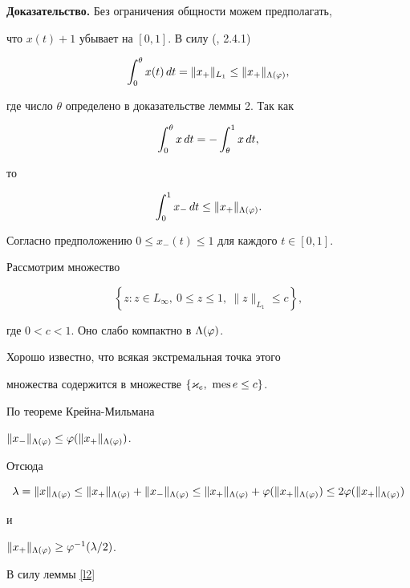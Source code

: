 {\bf Доказательство.} Без ограничения общности можем предполагать, 


что $x(t) +1$ убывает на $[0,1]$. В силу (\cite{KPS}, 2.4.1)


$$


\intl{0}{\theta} x(t)\, dt = \|x_+\|_{L_1} \le \|x_+ \|_{\Lambda(\ph)}, 


$$


где число $\theta$ определено в доказательстве леммы 2. Так как 


$$


\intl{0}{\theta} x\, dt = -\intl{\theta}{1} x\, dt, 


$$


то 


$$


\intl{0}{1} x_- \, dt\le \|x_+ \|_{\Lambda (\ph)}. 


$$





Согласно предположению $0 \le x_- (t) \le 1$ для каждого $t\in [0,1]$.


Рассмотрим множество


$$


\left\{ z: z\in L_\infty, \ 0 \le z \le 1, \ \|z\|_{L_1} \le c\right\}, 


$$


где $0 < c < 1$. Оно слабо компактно в $\Lambda(\varphi)$.


Хорошо известно, что всякая экстремальная точка этого 


множества содержится в множестве $\{\varkappa_e ,\ \operatorname{mes}  e \le c\}$. 


По теореме Крейна-Мильмана


$\|x_-\|_{\Lambda (\varphi)} \le \varphi ( \|x_+\|_{\Lambda(\varphi)})$. 


Отсюда 


$$


\lambda = \|x\|_{\Lambda(\ph)} \le \|x_+\|_{\Lambda(\ph)} + \|x_- \|_{\Lambda


(\ph)} \le 


\|x_+\|_{\Lambda (\ph)} + \ph ( \|x_+\|_{\Lambda(\ph)}) \le 


2 \ph ( \|x_+\|_{\Lambda(\ph)})


$$


и 


$\|x_+\|_{\Lambda (\varphi)} \ge \varphi^{-1} ( \lambda/ 2)$. 


В силу леммы \ref{l2}


$$


